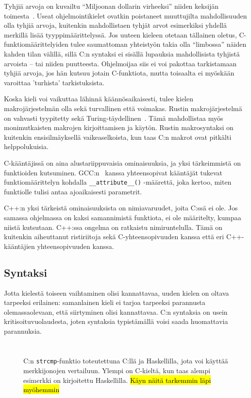 Tyhjiä arvoja on kuvailtu ``Miljoonan dollarin virheeksi'' niiden keksijän
toimesta~\citep{billiondollars}. Useat ohjelmointikielet ovatkin poistaneet
muuttujilta mahdollisuuden olla tyhjiä arvoja, kuitenkin mahdollistaen tyhjät
arvot esimerkiksi yhdellä merkillä lisää tyyppimäärittelyssä. Jos uuteen
kieleen otetaan tällainen oletus, C-funktiomäärittelyiden tulee saumattoman
yhteistyön takia olla ``limbossa'' näiden kahden tilan välillä, sillä C:n
syntaksi ei sisällä lupauksia mahdollisista tyhjistä arvoista -- tai niiden
puutteesta. Ohjelmoijaa siis ei voi pakottaa tarkistamaan tyhjiä arvoja, jos
hän kutsuu jotain C-funktiota, mutta toisaalta ei myöskään varoittaa 'turhista'
tarkistuksista.

Koska kieli voi vaikuttaa lähinnä käännösaikaisesti, tulee kielen
makrojärjestelmän olla sekä turvallinen että voimakas. Rustin makrojärjestelmä
on vahvasti tyypitetty sekä Turing-täydellinen~\citep{rustmacros}. Tämä
mahdollistaa myös monimutkaisten makrojen kirjoittamisen ja käytön. Rustin
makrosyntaksi on kuitenkin ensisilmäyksellä vaikeaselkoista, kun taas C:n
makrot ovat pitkälti helppolukuisia.

C-kääntäjissä on aina alustariippuvaisia ominaisuuksia, ja yksi tärkeimmistä on
funktioiden kutsuminen. GCC:n~\citep{gcc} kanssa yhteensopivat kääntäjät
tukevat funktiomäärittelyn kohdalla \texttt{\_\_attribute\_\_()} -määrettä,
joka kertoo, miten funktiolle tulisi antaa ajoaikaisesti parametrit.

C++:n yksi tärkeistä ominaisuuksista on nimiavaruudet, joita C:ssä ei ole. Jos
samassa ohjelmassa on kaksi samannimistä funktiota, ei ole määritelty, kumpaa
niistä kutsutaan. C++:ssa ongelma on ratkaistu nimiruntelulla. Tämä on
kuitenkin aiheuttanut ristiriitoja sekä C-yhteensopivuuden kanssa että eri
C++-kääntäjien yhteensopivuuden kanssa.

\subsection{Syntaksi}

Jotta kielestä toiseen vaihtaminen olisi kannattavaa, uuden kielen on oltava
tarpeeksi erilainen: samanlainen kieli ei tarjoa tarpeeksi parannusta
olemassaolevaan, että siirtyminen olisi kannattavaa. C:n syntaksia on usein
kritisoitu\citationneeded vuolaudesta, joten syntaksia typistämällä voisi saada
huomattavia parannuksia.

\begin{figure}[ht!]
    \inputminted{C}{strcmp.c}
    \inputminted{Haskell}{strcmp.hs}
    \caption{C:n \texttt{strcmp}-funktio toteutettuna C:llä ja Haskellilla,
    jota voi käyttää merkkijonojen vertailuun. Ylempi on C-kieltä, kun taas
    alempi esimerkki on kirjoitettu Haskellilla.
    \hl{Käyn näitä tarkemmin läpi myöhemmin}
    \label{fig:strcmp}
}
\end{figure}

